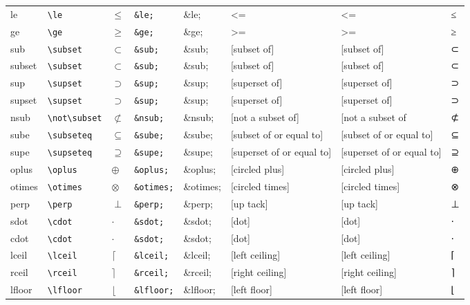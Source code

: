\documentclass[11pt]{article}
\begin{document}
\begin{longtable}{llllllll}
le & \texttt{\textbackslash{}le} & $\le$ & \texttt{\&le;} & \&le; & <= & <= & ≤\\
ge & \texttt{\textbackslash{}ge} & $\ge$ & \texttt{\&ge;} & \&ge; & >= & >= & ≥\\
sub & \texttt{\textbackslash{}subset} & $\subset$ & \texttt{\&sub;} & \&sub; & [subset of] & [subset of] & ⊂\\
subset & \texttt{\textbackslash{}subset} & $\subset$ & \texttt{\&sub;} & \&sub; & [subset of] & [subset of] & ⊂\\
sup & \texttt{\textbackslash{}supset} & $\supset$ & \texttt{\&sup;} & \&sup; & [superset of] & [superset of] & ⊃\\
supset & \texttt{\textbackslash{}supset} & $\supset$ & \texttt{\&sup;} & \&sup; & [superset of] & [superset of] & ⊃\\
nsub & \texttt{\textbackslash{}not\textbackslash{}subset} & $\not\subset$ & \texttt{\&nsub;} & \&nsub; & [not a subset of] & [not a subset of & ⊄\\
sube & \texttt{\textbackslash{}subseteq} & $\subseteq$ & \texttt{\&sube;} & \&sube; & [subset of or equal to] & [subset of or equal to] & ⊆\\
supe & \texttt{\textbackslash{}supseteq} & $\supseteq$ & \texttt{\&supe;} & \&supe; & [superset of or equal to] & [superset of or equal to] & ⊇\\
oplus & \texttt{\textbackslash{}oplus} & $\oplus$ & \texttt{\&oplus;} & \&oplus; & [circled plus] & [circled plus] & ⊕\\
otimes & \texttt{\textbackslash{}otimes} & $\otimes$ & \texttt{\&otimes;} & \&otimes; & [circled times] & [circled times] & ⊗\\
perp & \texttt{\textbackslash{}perp} & $\perp$ & \texttt{\&perp;} & \&perp; & [up tack] & [up tack] & ⊥\\
sdot & \texttt{\textbackslash{}cdot} & $\cdot$ & \texttt{\&sdot;} & \&sdot; & [dot] & [dot] & ⋅\\
cdot & \texttt{\textbackslash{}cdot} & $\cdot$ & \texttt{\&sdot;} & \&sdot; & [dot] & [dot] & ⋅\\
lceil & \texttt{\textbackslash{}lceil} & $\lceil$ & \texttt{\&lceil;} & \&lceil; & [left ceiling] & [left ceiling] & ⌈\\
rceil & \texttt{\textbackslash{}rceil} & $\rceil$ & \texttt{\&rceil;} & \&rceil; & [right ceiling] & [right ceiling] & ⌉\\
lfloor & \texttt{\textbackslash{}lfloor} & $\lfloor$ & \texttt{\&lfloor;} & \&lfloor; & [left floor] & [left floor] & ⌊\\

\end{longtable}
\end{document}
